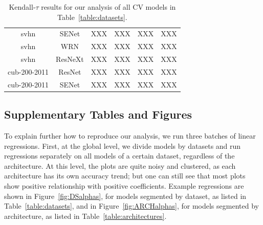 \begin{table}[t]
\begin{center}
\begin{tabular}{|c|c|c|c|c|c|}
 svhn         & SENet         &  XXX &   XXX &  XXX &  XXX \\
 svhn         & WRN           &  XXX &   XXX &  XXX &  XXX \\
 svhn         & ResNeXt       &  XXX &   XXX &  XXX &  XXX \\
\hline
 cub-200-2011 & ResNet        &  XXX &   XXX &  XXX &  XXX \\
 cub-200-2011 & SENet         &  XXX &   XXX &  XXX &  XXX \\
\hline
\end{tabular}
\end{center}
\vspace{-5mm}
\caption{Kendall-$\tau$ results for our analysis of all CV models in Table~\ref{table:datasets}. }
\label{table:KTresults}
\end{table}


\subsection{Supplementary Tables and Figures}



To explain further how to reproduce our analysis, we run three batches of linear regressions. 
First, at the global level, we divide models by datasets and run regressions separately on all models of a certain dataset, regardless of the architecture. 
At this level, the plots are quite noisy and clustered, as each architecture has its own accuracy trend; but one can
 still see that most plots show positive relationship with positive coefficients. 
Example regressions are shown in 
Figure~\ref{fig:DSalphas}, for models segmented by dataset, as listed in Table~\ref{table:datasets}, 
and in 
Figure~\ref{fig:ARCHalphas}, for models segmented by architecture, as listed in Table~\ref{table:architectures}.

